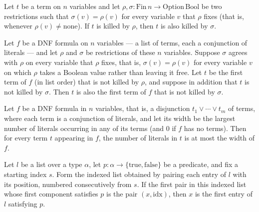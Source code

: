 \begin{lemma}
\label{SwitchingLemma.killedBy_of_nonfree_agree}
\leanok
{}
Let $t$ be a term on $n$ variables and let $\rho, \sigma : \mathrm{Fin}\,n \to
\mathrm{Option}\,\mathrm{Bool}$ be two restrictions such that $\sigma(v) = \rho(v)$ for
every variable $v$ that $\rho$ fixes (that is, whenever $\rho(v) \neq \mathrm{none}$).
If $t$ is killed by $\rho$, then $t$ is also killed by $\sigma$.
\end{lemma}

\begin{lemma}
\label{SwitchingLemma.first_clause_preserved}
\leanok
{}
Let $f$ be a DNF formula on $n$ variables — a list of terms, each a conjunction of
literals — and let $\rho$ and $\sigma$ be restrictions of these $n$ variables. Suppose
$\sigma$ agrees with $\rho$ on every variable that $\rho$ fixes, that is, $\sigma(v) =
\rho(v)$ for every variable $v$ on which $\rho$ takes a Boolean value rather than
leaving it free. Let $t$ be the first term of $f$ (in list order) that is not killed by
$\rho$, and suppose in addition that $t$ is not killed by $\sigma$. Then $t$ is also the
first term of $f$ that is not killed by $\sigma$.
\end{lemma}

\begin{lemma}
\label{SwitchingLemma.term_length_le_width}
\leanok
{}
Let $f$ be a DNF formula in $n$ variables, that is, a disjunction $t_1 \vee \cdots \vee
t_m$ of terms, where each term is a conjunction of literals, and let its width be the
largest number of literals occurring in any of its terms (and $0$ if $f$ has no terms).
Then for every term $t$ appearing in $f$, the number of literals in $t$ is at most the
width of $f$.
\end{lemma}

\begin{lemma}
\label{SwitchingLemma.zipIdx_find_to_find}
\leanok
{}
Let $l$ be a list over a type $\alpha$, let
$p\colon\alpha\to\{\text{true},\text{false}\}$ be a predicate, and fix a starting index
$s$. Form the indexed list obtained by pairing each entry of $l$ with its position,
numbered consecutively from $s$. If the first pair in this indexed list whose first
component satisfies $p$ is the pair $(x,\mathrm{idx})$, then $x$ is the first entry of
$l$ satisfying $p$.
\end{lemma}

